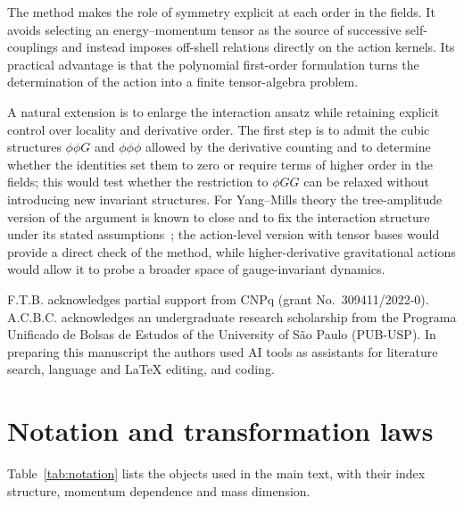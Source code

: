 \documentclass[prd,aps,preprint,nofootinbib,amsmath,amssymb,eqsecnum]{revtex4-2}
\begin{document}
The method makes the role of symmetry explicit at each order in the fields. It avoids
selecting an energy--momentum tensor as the source of successive self-couplings and instead
imposes off-shell relations directly on the action kernels. Its practical advantage is that
the polynomial first-order formulation turns the determination of the action into a finite tensor-algebra
problem.

A natural extension is to enlarge the interaction ansatz while retaining explicit control
over locality and derivative order. The first step is to admit the cubic structures
$\phi\phi G$ and $\phi\phi\phi$ allowed by the derivative counting and to determine whether
the identities set them to zero or require terms of higher order in the fields; this would
test whether the restriction to $\phi GG$ can be relaxed without introducing new invariant
structures.
For Yang--Mills theory the tree-amplitude version of the argument is known to close and
to fix the interaction structure under its stated assumptions~\cite{BrandtFrenkel1996}; the
action-level version with tensor bases would provide a direct check of the method, while higher-derivative gravitational
actions would allow it to probe a broader space of gauge-invariant dynamics.

\begin{acknowledgments}
F.T.B. acknowledges partial support from CNPq (grant No.~309411/2022-0).
A.C.B.C. acknowledges an undergraduate research scholarship from the Programa Unificado de
Bolsas de Estudos of the University of S\~ao Paulo (PUB-USP).
In preparing this manuscript the authors used AI tools as assistants for
literature search, language and LaTeX editing, and coding.
\end{acknowledgments}

\appendix

\section{Notation and transformation laws}
\label{app:transf}

Table~\ref{tab:notation} lists the objects used in the main text, with their index
structure, momentum dependence and mass dimension.
\end{document}
